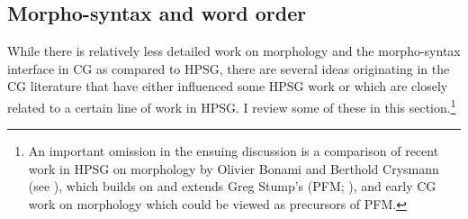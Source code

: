 \documentclass[output=paper
                ,modfonts
                ,nonflat
	        ,collection
	        ,collectionchapter
	        ,collectiontoclongg
 	        ,biblatex
                ,babelshorthands
                ,newtxmath
                ,draftmode
                ,colorlinks, citecolor=brown
]{./langsci/langscibook}
\begin{document}




\subsection{Morpho-syntax and word order \label{sec:morphology}}

While there is relatively less detailed work on morphology and the
morpho-syntax interface in CG as compared to HPSG, there are several
ideas originating in the CG literature that have either
influenced some HPSG work or which are closely related to a certain
line of work in HPSG. I review some of these in this
section.\footnote{An important omission in the ensuing discussion is a
comparison of recent work in HPSG on morphology by Olivier Bonami and
Berthold Crysmann (see ), which builds on
and extends Greg Stump's  (PFM;
\citealt{Stump2001a-u-kopiert}), and early CG work on morphology
\citep{hoeksema-diss,moortgat84,hoeksemajanda88,raffelsiefen92} which
could be viewed as precursors of PFM.}

\end{document}
